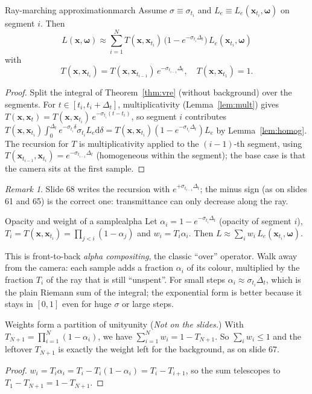 \documentclass[11pt,a4paper]{article}
\newcommand{\x}{\bm{x}}
\newcommand{\w}{\bm{\omega}}
\theoremstyle{remark}\newtheorem*{remark}{Remark}
\begin{document}
\begin{proposition}{Ray-marching approximation}{march}
Assume $\sigma\equiv\sigma_{t_i}$ and $L_e\equiv L_e(\x_{t_i},\w)$ on segment $i$. Then
\[
L(\x,\w)\approx\sum_{i=1}^{N}T(\x,\x_{t_i})\,\bigl(1-e^{-\sigma_{t_i}\Delta_t}\bigr)\,L_e(\x_{t_i},\w)
\]
with
\[
T(\x,\x_{t_i})=T(\x,\x_{t_{i-1}})\,e^{-\sigma_{t_{i-1}}\Delta_t},\quad T(\x,\x_{t_1})=1.
\]
\end{proposition}
\begin{proof}
Split the integral of Theorem~\ref{thm:vre} (without background) over the segments. For $t\in[t_i,t_i+\Delta_t]$, multiplicativity (Lemma~\ref{lem:mult}) gives $T(\x,\x_t)=T(\x,\x_{t_i})\,e^{-\sigma_{t_i}(t-t_i)}$, so segment $i$ contributes $T(\x,\x_{t_i})\int_0^{\Delta_t}e^{-\sigma_{t_i}\delta}\sigma_{t_i}L_e\mathrm d\delta=T(\x,\x_{t_i})(1-e^{-\sigma_{t_i}\Delta_t})L_e$ by Lemma~\ref{lem:homog}. The recursion for $T$ is multiplicativity applied to the $(i-1)$-th segment, using $T(\x_{t_{i-1}},\x_{t_i})=e^{-\sigma_{t_{i-1}}\Delta_t}$ (homogeneous within the segment); the base case is that the camera sits at the first sample.
\end{proof}

\begin{remark}
Slide 68 writes the recursion with $e^{+\sigma_{t_{i-1}}\Delta_t}$; the minus sign (as on slides 61 and 65) is the correct one: transmittance can only decrease along the ray.
\end{remark}

\begin{definition}{Opacity and weight of a sample}{alpha}
Let $\alpha_i=1-e^{-\sigma_{t_i}\Delta_t}$ (opacity of segment $i$), $T_i=T(\x,\x_{t_i})=\prod_{j<i}(1-\alpha_j)$ and $w_i=T_i\alpha_i$. Then $L\approx\sum_iw_i\,L_e(\x_{t_i},\w)$.
\end{definition}

\begin{intuition}
This is front-to-back \emph{alpha compositing}, the classic ``over'' operator. Walk away from the camera: each sample adds a fraction $\alpha_i$ of its colour, multiplied by the fraction $T_i$ of the ray that is still ``unspent''. For small steps $\alpha_i\approx\sigma_{t_i}\Delta_t$, which is the plain Riemann sum of the integral; the exponential form is better because it stays in $[0,1]$ even for huge $\sigma$ or large steps.
\end{intuition}

\begin{proposition}{Weights form a partition of unity}{unity}
(\emph{Not on the slides.}) With $T_{N+1}=\prod_{i=1}^N(1-\alpha_i)$, we have $\sum_{i=1}^Nw_i=1-T_{N+1}$. So $\sum_iw_i\le1$ and the leftover $T_{N+1}$ is exactly the weight left for the background, as on slide 67.
\end{proposition}
\begin{proof}
$w_i=T_i\alpha_i=T_i-T_i(1-\alpha_i)=T_i-T_{i+1}$, so the sum telescopes to $T_1-T_{N+1}=1-T_{N+1}$.
\end{proof}
\end{document}
